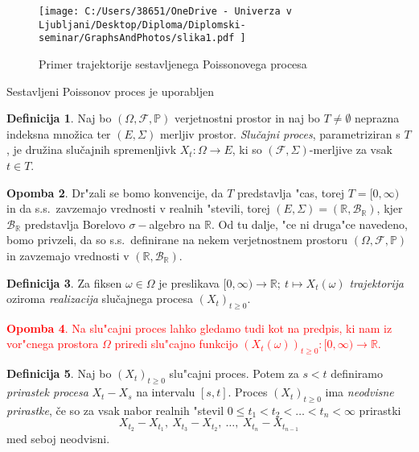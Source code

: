 \documentclass[12pt, a4paper, reqno]{amsart}
\theoremstyle{definition} %
\newtheorem{definicija}{Definicija}[section]
\newtheorem{opomba}[definicija]{Opomba}
\theoremstyle{plain} %
\newcommand{\R}{\mathbb{R}}
\newcommand{\B}{\mathcal{B}}
\newcommand{\1}{\mathds{1}}
\begin{document}
    \begin{figure}[H]
        \centering
        \texttt{[image: 
            C:/Users/38651/OneDrive - Univerza v Ljubljani/Desktop/Diploma/Diplomski-seminar/GraphsAndPhotos/slika1.pdf
            ]}
        \caption{Primer trajektorije sestavljenega Poissonovega procesa}
        \label{fig:slika1}
    \end{figure}
    
    \noindent
    Sestavljeni Poissonov proces je uporabljen 


    \begin{definicija}
        Naj bo $(\Omega, \mathcal{F}, \mathbb{P})$ verjetnostni prostor in naj bo $T\neq\emptyset$
        neprazna indeksna množica ter $(E, \Sigma)$ merljiv prostor. \textit{Slučajni proces}, 
        parametriziran s $T$, je družina slučajnih spremenljivk $X_t : \Omega \to E$,
         ki so $(\mathcal{F}, \Sigma)$-merljive za vsak $t \in T$.
        \label{def:slucProc}
    \end{definicija}

    \begin{opomba}
        Dr"zali se bomo konvencije, da $T$ predstavlja "cas, torej $T = [0, \infty)$ in da s.s.\
        zavzemajo vrednosti v realnih "stevili, torej $(E, \Sigma) = (\R, \B_{\R})$, kjer $\B_\R$ 
        predstavlja Borelovo $\sigma-$algebro na $\R$. Od tu dalje, "ce ni druga"ce navedeno, bomo 
        privzeli, da so s.s.\ definirane na nekem verjetnostnem prostoru 
        $(\Omega, \mathcal{F}, \mathbb{P})$ in zavzemajo vrednosti v $(\R, \B_{\R})$.
        \label{op:Konvencije}
    \end{opomba}


    \begin{definicija}
        Za fiksen $\omega \in \Omega$ je preslikava 
        $[0, \infty) \rightarrow \mathbb{R}; \ t \mapsto X_t(\omega)$ 
        \textit{trajektorija} oziroma \textit{realizacija} slučajnega procesa $(X_t)_{t\geq0}$.
        \label{def:realizac}
    \end{definicija}

\textcolor{red}{
    \begin{opomba}
        Na slu"cajni proces lahko gledamo tudi kot na predpis, ki nam iz vor"cnega prostora 
        $\Omega$ priredi slu"cajno funkcijo
        $(X_t(\omega))_{t\geq0}: [0, \infty) \rightarrow \mathbb{R}$.
        \label{op:slucFunkc}
    \end{opomba}
}
    \begin{definicija}
        Naj bo $(X_t)_{t\geq0}$ slu"cajni proces. Potem za $s < t$ definiramo
        \textit{prirastek procesa} $X_t - X_s$ na intervalu $[s, t]$. Proces $(X_t)_{t\geq0}$ ima 
        \textit{neodvisne prirastke}, če so za vsak nabor realnih "stevil
        $0 \leq t_1 < t_2 < \ldots < t_n < \infty$ prirastki
        $$
            X_{t_2} - X_{t_1}, \ X_{t_3} - X_{t_2}, \ \ldots, \ X_{t_n} - X_{t_{n-1}}
        $$
        med seboj neodvisni.
        \label{def:prirastek}
    \end{definicija}
\end{document}
